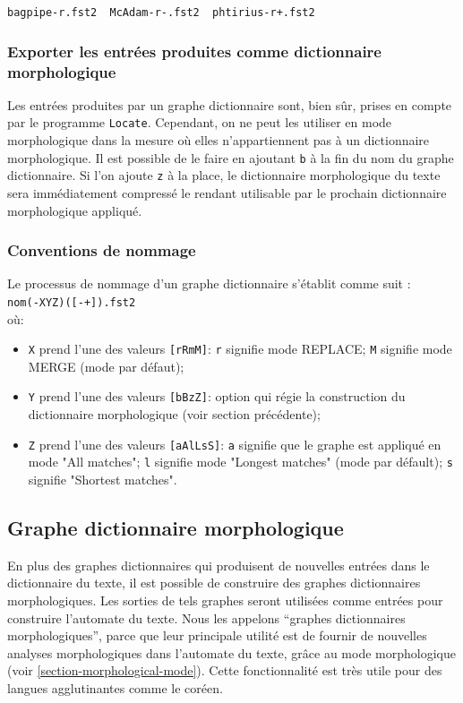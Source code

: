 \bigskip
\verb?bagpipe-r.fst2  McAdam-r-.fst2  phtirius-r+.fst2?


\subsubsection{Exporter les entrées produites comme dictionnaire morphologique}
Les entrées produites par un graphe dictionnaire sont, bien sûr, prises en compte
par le programme \verb+Locate+. Cependant, on ne peut les utiliser en mode morphologique
dans la mesure où elles n'appartiennent pas à un dictionnaire morphologique.
Il est possible de le faire en ajoutant \verb+b+ à la fin du nom du graphe dictionnaire. 
Si l'on ajoute \verb+z+ à la place, le dictionnaire morphologique du texte sera immédiatement
compressé le rendant utilisable par le prochain dictionnaire morphologique appliqué.
 
\subsubsection{Conventions de nommage}
Le processus de nommage d'un graphe dictionnaire s'établit comme suit :\\

\verb$nom(-XYZ)([-+]).fst2$\\

\noindent où:
\begin{itemize}
\item \verb+X+ prend l'une des valeurs \verb+[rRmM]+: \verb+r+ signifie mode REPLACE; \verb+M+
signifie mode MERGE (mode par défaut);
\item \verb+Y+ prend l'une des valeurs \verb+[bBzZ]+: option qui régie la construction du
dictionnaire morphologique (voir section précédente);
\item \verb+Z+ prend l'une des valeurs \verb+[aAlLsS]+: \verb+a+ signifie que le graphe est appliqué
en mode "All matches"; \verb+l+ signifie mode "Longest matches" (mode par défault); 
\verb+s+ signifie "Shortest matches".
\end{itemize}


\subsection{Graphe dictionnaire morphologique}
En plus des graphes dictionnaires  qui produisent de nouvelles entrées dans le dictionnaire du
texte, il est possible de construire des graphes dictionnaires morphologiques.
Les sorties de tels graphes seront utilisées comme entrées pour construire l'automate du texte. Nous
les appelons ``graphes dictionnaires morphologiques'', parce que leur principale utilité est de
fournir de nouvelles analyses morphologiques dans l'automate du texte, grâce au mode morphologique
(voir \ref{section-morphological-mode}). Cette fonctionnalité est très utile pour des langues
agglutinantes comme le coréen.


